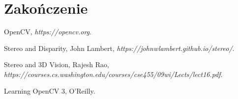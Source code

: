 \documentclass[magisterska]{pracadypl}
\begin{document}
\chapter{Zakończenie}

\begin{thebibliography}{7}

OpenCV, 
\textit{https://opencv.org}.

Stereo and Disparity, John Lambert,  
\textit{https://johnwlambert.github.io/stereo/}.

Stereo and 3D Vision, Rajesh Rao, 
\textit{https://courses.cs.washington.edu/courses/cse455/09wi/Lects/lect16.pdf}.

Learning OpenCV 3, O'Reilly. 

\end{thebibliography}
\end{document}
